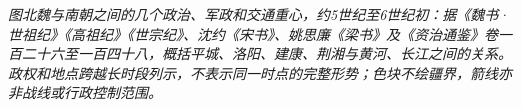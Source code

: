 \begin{center}

\smallskip
\small\textit{图\quad 北魏与南朝之间的几个政治、军政和交通重心，约5世纪至6世纪初：据《魏书·世祖纪》《高祖纪》《世宗纪》、沈约《宋书》、姚思廉《梁书》及《资治通鉴》卷一百二十六至一百四十八，概括平城、洛阳、建康、荆湘与黄河、长江之间的关系。政权和地点跨越长时段列示，不表示同一时点的完整形势；色块不绘疆界，箭线亦非战线或行政控制范围。}
\end{center}

\label{fig:northern-southern-courts}
